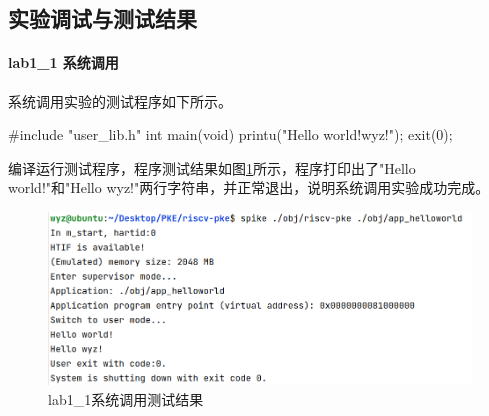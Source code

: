 \subsection{实验调试与测试结果}
\paragraph{lab1_1 系统调用} 系统调用实验的测试程序如下所示。
\begin{cppcode}
#include "user_lib.h"
int main(void) {
  printu("Hello world!\nHello wyz!\n");
  exit(0);
}
\end{cppcode}
编译运行测试程序，程序测试结果如图\ref{fig:lab1-1-testres}所示，程序打印出了"Hello world!"和"Hello wyz!"两行字符串，并正常退出，说明系统调用实验成功完成。
\begin{figure}[!htbp]
    \centering
    \includegraphics[width = 13cm]{figure/lab1_1_testresult.png}
    \caption{lab1_1系统调用测试结果}
    \label{fig:lab1-1-testres}
\end{figure}


